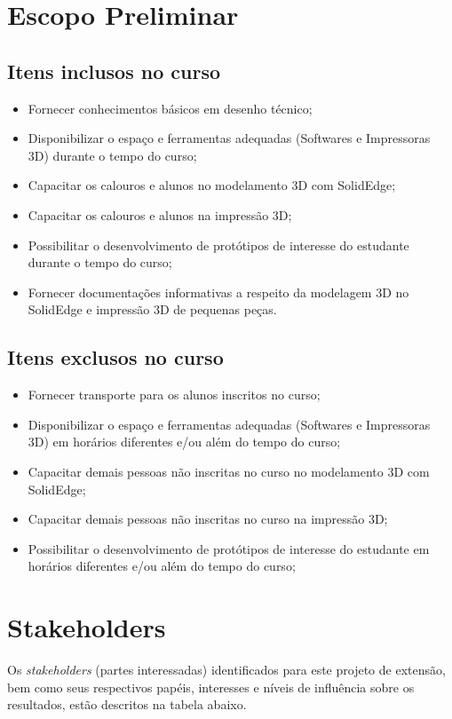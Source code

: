 \documentclass[12pt, a4paper]{article}
\begin{document}
\section{Escopo Preliminar}
\subsection{Itens inclusos no curso}
\begin{itemize}
    \item Fornecer conhecimentos básicos em desenho técnico;
    \item Disponibilizar o espaço e ferramentas adequadas (Softwares e Impressoras 3D) durante o tempo do curso;
    \item Capacitar os calouros e alunos no modelamento 3D com SolidEdge;
    \item Capacitar os calouros e alunos na impressão 3D;
    \item Possibilitar o desenvolvimento de protótipos de interesse do estudante durante o tempo do curso;
    \item Fornecer documentações informativas a respeito da modelagem 3D no SolidEdge e impressão 3D de pequenas peças.
\end{itemize}
\subsection{Itens exclusos no curso}
\begin{itemize}
    \item Fornecer transporte para os alunos inscritos no curso;
    \item Disponibilizar o espaço e ferramentas adequadas (Softwares e Impressoras 3D) em horários diferentes e/ou além do tempo do curso;
    \item Capacitar demais pessoas não inscritas no curso no modelamento 3D com SolidEdge;
    \item Capacitar demais pessoas não inscritas no curso na impressão 3D;
    \item Possibilitar o desenvolvimento de protótipos de interesse do estudante em horários diferentes e/ou além do tempo do curso;
\end{itemize}

\section{Stakeholders}

Os \textit{stakeholders} (partes interessadas) identificados para este projeto de extensão, bem como seus respectivos papéis, interesses e níveis de influência sobre os resultados, estão descritos na tabela abaixo.
\end{document}
